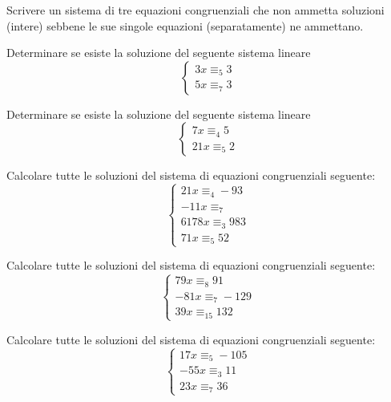\begin{flushleft}
\begin{esercizio}
Scrivere un sistema di tre equazioni congruenziali che non ammetta soluzioni (intere) sebbene le sue singole equazioni (separatamente) ne ammettano.
\end{esercizio}
\vspace{200px}

\begin{esercizio}
Determinare se esiste la soluzione del seguente sistema lineare
\[\begin{cases}
3x\equiv_{5} 3\\
5x\equiv_{7} 3
\end{cases}
\]
\end{esercizio}
\vspace{200px}

\begin{esercizio}
Determinare se esiste la soluzione del seguente sistema lineare
\[\begin{cases}
7x\equiv_{4} 5\\
21x\equiv_{5} 2
\end{cases}
\]
\end{esercizio}
\vspace{200px}

\begin{esercizio}
Calcolare tutte le soluzioni del sistema di equazioni congruenziali seguente:
\[\begin{cases}
21x\equiv_{4} -93\\
-11x\equiv_{7} \\
6178x\equiv_{3} 983\\
71x\equiv_{5} 52
\end{cases}
\]
\end{esercizio}
\vspace{200px}


\begin{esercizio}
Calcolare tutte le soluzioni del sistema di equazioni congruenziali seguente:
\[\begin{cases}
79x\equiv_{8} 91\\
-81x\equiv_{7} -129\\
39x\equiv_{15} 132
\end{cases}
\]
\end{esercizio}
\vspace{200px}


\begin{esercizio}
Calcolare tutte le soluzioni del sistema di equazioni congruenziali seguente:
\[\begin{cases}
17x\equiv_{5} -105\\
-55x\equiv_{3} 11\\
23x\equiv_{7} 36
\end{cases}
\]
\end{esercizio}
\vspace{200px}


\end{flushleft}
